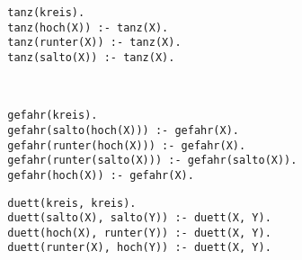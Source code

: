 \documentclass[a4paper,10pt]{article}
\begin{document}
	\begin{compactenum} [(a)]
		\item 
		\begin{verbatim}
		tanz(kreis).
		tanz(hoch(X)) :- tanz(X).
		tanz(runter(X)) :- tanz(X).
		tanz(salto(X)) :- tanz(X).
		\end{verbatim}\
		\item 
		\begin{verbatim}
		gefahr(kreis).
		gefahr(salto(hoch(X))) :- gefahr(X).
		gefahr(runter(hoch(X))) :- gefahr(X).
		gefahr(runter(salto(X))) :- gefahr(salto(X)).
		gefahr(hoch(X)) :- gefahr(X).
		\end{verbatim}
		\item 
		\begin{verbatim}
		duett(kreis, kreis).
		duett(salto(X), salto(Y)) :- duett(X, Y).
		duett(hoch(X), runter(Y)) :- duett(X, Y).
		duett(runter(X), hoch(Y)) :- duett(X, Y).
		\end{verbatim}
	\end{compactenum}
\end{document}
